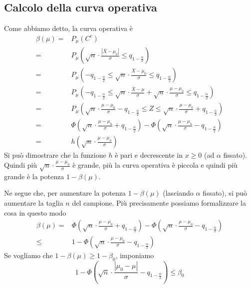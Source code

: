 \subsection{Calcolo della curva operativa}
Come abbiamo detto, la curva operativa è
\begin{align*}
	\beta (\mu) = & P_\mu (C^c)                                                              \\
	=             & P_\mu \left( \sqrt{n} \cdot \frac{|\overline{X} - \mu_0|}{\sigma}
	\leq q_{1 - \frac{\alpha}{2}} \right)                                                    \\
	=             & P_\mu \left( -q_{1-\frac{\alpha}{2}} \leq
	\sqrt{n} \cdot \frac{\overline{X} - \mu_0}{\sigma} \leq q_{1 - \frac{\alpha}{2}} \right) \\
	=             & P_\mu \left( -q_{1-\frac{\alpha}{2}} \leq
	\sqrt{n} \cdot \frac{\overline{X} - \mu}{\sigma} + \sqrt{n} \cdot \frac{\mu - \mu_0}{\sigma}
	\leq q_{1-\frac{\alpha}{2}} \right)                                                      \\
	=             & P_\mu \left( \sqrt{n} \cdot \frac{\mu - \mu_0}{\sigma} -
	q_{1 - \frac{\alpha}{2}} \leq Z \leq
	\sqrt{n} \cdot \frac{\mu - \mu_0}{\sigma} + q_{1-\frac{\alpha}{2}} \right)               \\
	=             & \Phi \left( \sqrt{n} \cdot \frac{\mu - \mu_0}{\sigma} +
	q_{1-\frac{\alpha}{2}} \right) - \Phi \left( \sqrt{n} \cdot
	\frac{\mu - \mu_0}{\sigma} - q_{1-\frac{\alpha}{2}} \right)                              \\
	=             & h \left( \sqrt{n} \cdot \frac{\mu - \mu_0}{\sigma} \right)
\end{align*}
Si può dimostrare che la funzione $h$ è pari e decrescente in $x \geq 0$ (ad $\alpha$ fissato).
Quindi più $\sqrt{n} \cdot \frac{\mu - \mu_0}{\sigma}$ è grande, più la curva operativa è piccola
e quindi più grande è la potenza $1 - \beta(\mu)$.

Ne segue che, per aumentare la potenza $1 - \beta(\mu)$ (lasciando $\alpha$ fissato), si può
aumentare la taglia $n$ del campione. Più precisamente possiamo formalizzare la cosa in questo modo
\begin{align*}
	\beta (\mu) = & \Phi \left( \sqrt{n} \cdot \frac{\mu - \mu_0}{\sigma} +
	q_{1-\frac{\alpha}{2}} \right) - \Phi \left( \sqrt{n} \cdot
	\frac{\mu - \mu_0}{\sigma} - q_{1-\frac{\alpha}{2}} \right)                 \\
	\leq          & 1 - \Phi \left( \sqrt{n} \cdot \frac{\mu - \mu_0}{\sigma} -
	q_{1-\frac{\alpha}{2}} \right)
\end{align*}
Se vogliamo che $1-\beta(\mu) \geq 1 - \beta_0$, imponiamo
\[
	1 - \Phi \left( \sqrt{n} \cdot \frac{|\mu_0 - \mu|}{\sigma} -
	q_{1-\frac{\alpha}{2}} \right) \leq \beta_0
\]